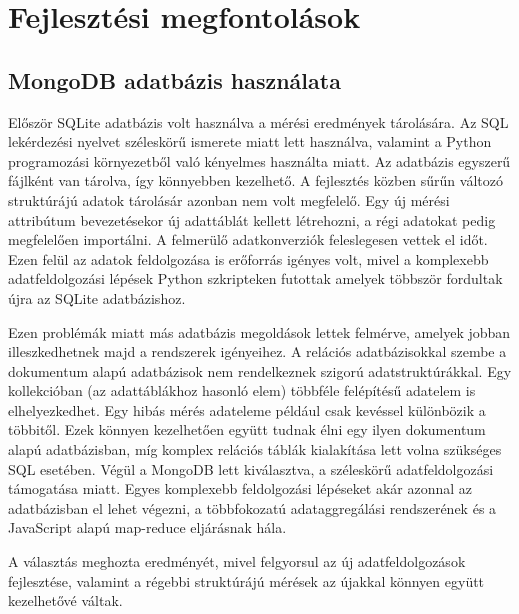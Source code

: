 
\section{Fejlesztési megfontolások}


\subsection{MongoDB adatbázis használata}
Először SQLite adatbázis volt használva a mérési eredmények tárolására. Az SQL lekérdezési nyelvet széleskörű ismerete miatt lett használva, valamint a Python programozási környezetből való kényelmes használta miatt. Az adatbázis egyszerű fájlként van tárolva, így könnyebben kezelhető. A fejlesztés közben sűrűn változó struktúrájú adatok tárolásár azonban nem volt megfelelő. Egy új mérési attribútum bevezetésekor új adattáblát kellett létrehozni, a régi adatokat pedig megfelelően importálni. A felmerülő adatkonverziók feleslegesen vettek el időt. Ezen felül az adatok feldolgozása is erőforrás igényes volt, mivel a komplexebb adatfeldolgozási lépések Python szkripteken futottak amelyek többször fordultak újra az SQLite adatbázishoz.

Ezen problémák miatt más adatbázis megoldások lettek felmérve, amelyek jobban illeszkedhetnek majd a rendszerek igényeihez. A relációs adatbázisokkal szembe a dokumentum alapú adatbázisok nem rendelkeznek szigorú adatstruktúrákkal. Egy kollekcióban (az adattáblákhoz hasonló elem) többféle felépítésű adatelem is elhelyezkedhet. Egy hibás mérés adateleme például csak kevéssel különbözik a többitől. Ezek könnyen kezelhetően együtt tudnak élni egy ilyen dokumentum alapú adatbázisban, míg komplex relációs táblák kialakítása lett volna szükséges SQL esetében. Végül a MongoDB lett kiválasztva, a széleskörű adatfeldolgozási támogatása miatt. Egyes komplexebb feldolgozási lépéseket akár azonnal az adatbázisban el lehet végezni, a többfokozatú adataggregálási rendszerének és a JavaScript alapú map-reduce eljárásnak hála.

A választás meghozta eredményét, mivel felgyorsul az új adatfeldolgozások fejlesztése, valamint a régebbi struktúrájú mérések az újakkal könnyen együtt kezelhetővé váltak.



